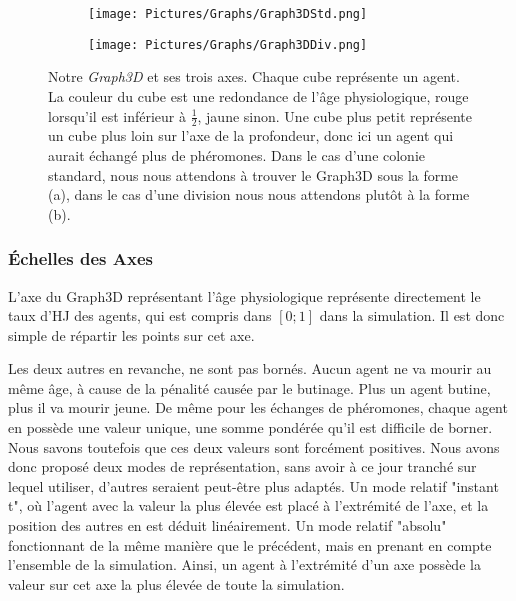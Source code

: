 	\begin{figure}
	\centering
	
	\begin{subfigure}{\textwidth}
	\centering
	\texttt{[image: Pictures/Graphs/Graph3DStd.png]}
	\caption{}
	\label{Graph3DStd}	
	\end{subfigure}
	
	\begin{subfigure}{\textwidth}
	\centering
	\texttt{[image: Pictures/Graphs/Graph3DDiv.png]}
	\caption{}
	\label{Graph3DDiv}
	\end{subfigure}
	
	\caption[Notre \textit{Graph3D} et ses trois axes.]{Notre \textit{Graph3D} et ses trois axes. Chaque cube représente un agent. La couleur du cube est une redondance de l'âge physiologique, rouge lorsqu'il est inférieur à $\frac{1}{2}$, jaune sinon. Une cube plus petit représente un cube plus loin sur l'axe de la profondeur, donc ici un agent qui aurait échangé plus de phéromones. Dans le cas d'une colonie standard, nous nous attendons à trouver le Graph3D sous la forme (a), dans le cas d'une division nous nous attendons plutôt à la forme (b).}	
	\label{Graph3D}
	\end{figure}
	
	\subsubsection{Échelles des Axes}
	L'axe du Graph3D représentant l'âge physiologique représente directement le taux d'HJ des agents, qui est compris dans $[0;1]$ dans la simulation. Il est donc simple de répartir les points sur cet axe.
	
	Les deux autres en revanche, ne sont pas bornés. Aucun agent ne va mourir au même âge, à cause de la pénalité causée par le butinage. Plus un agent butine, plus il va mourir jeune. De même pour les échanges de phéromones, chaque agent en possède une valeur unique, une somme pondérée qu'il est difficile de borner. Nous savons toutefois que ces deux valeurs sont forcément positives. Nous avons donc proposé deux modes de représentation, sans avoir à ce jour tranché sur lequel utiliser, d'autres seraient peut-être plus adaptés. Un mode relatif "instant t", où l'agent avec la valeur la plus élevée est placé à l'extrémité de l'axe, et la position des autres en est déduit linéairement. Un mode relatif "absolu" fonctionnant de la même manière que le précédent, mais en prenant en compte l'ensemble de la simulation. Ainsi, un agent à l'extrémité d'un axe possède la valeur sur cet axe la plus élevée de toute la simulation.
	
